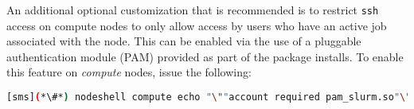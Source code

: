An additional optional customization that is recommended is to
restrict \texttt{ssh} access on compute nodes to only allow access by users who
have an active job associated with the node. This can be enabled via the use of
a pluggable authentication module (PAM) provided as part of the \SLURM{} package
installs. To enable this feature on {\em compute} nodes, issue the
following:

\begin{lstlisting}[language=bash,keywords={},upquote=true]
[sms](*\#*) nodeshell compute echo "\""account required pam_slurm.so"\"" \>\> /etc/pam.d/sshd
\end{lstlisting}
